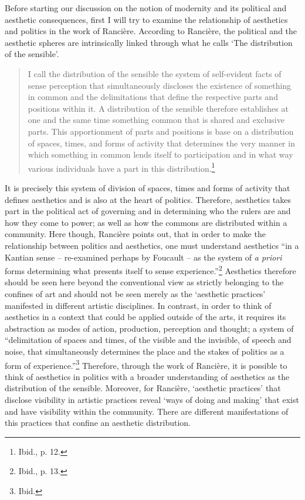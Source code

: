 Before starting our discussion on the notion of modernity and its political and aesthetic consequences, first I will try to examine the relationship of aesthetics and politics in the work of Ranci\`{e}re. According to Ranci\`{e}re, the political and the aesthetic spheres are intrinsically linked through what he calls `The distribution of the sensible'. 
\begin{quote}
I call the distribution of the sensible the system of self-evident facts of sense perception that simultaneously discloses the existence of something in common and the delimitations that define the respective parts and positions within it. A distribution of the sensible therefore establishes at one and the same time something common that is shared and exclusive parts. This apportionment of parts and positions is base on a distribution of spaces, times, and forms of activity that determines the very manner in which something in common lends itself to participation and in what way various individuals have a part in this distribution.\footnote{Ibid., p. 12.}
\end{quote}
It is precisely this system of division of spaces, times and forms of activity that defines aesthetics and is also at the heart of politics. Therefore, aesthetics takes part in the political act of governing and in determining who the rulers are and how they come to power; as well as how the commons are distributed within a community. Here though, Ranci\`{e}re points out, that in order to make the relationship between politics and aesthetics, one must understand aesthetics ``in a Kantian sense -- re-examined perhaps by Foucault -- as the system of \emph{a priori} forms determining what presents itself to sense experience.''\footnote{Ibid., p. 13.} Aesthetics therefore should be seen here beyond the conventional view as strictly belonging to the confines of art and should not be seen merely as the `aesthetic practices' manifested in different artistic disciplines.  In contrast, in order to think of aesthetics in a context that could be applied outside of the arts, it requires its abstraction as modes of action, production, perception and thought; a system of ``delimitation of spaces and times, of the visible and the invisible, of speech and noise, that simultaneously determines the place and the stakes of politics as a form of experience.''\footnote{Ibid.}
Therefore, through the work of Ranci\`{e}re, it is possible to think of aesthetics in politics with a broader understanding of aesthetics as the distribution of the sensible. Moreover, for Ranci\`{e}re, `aesthetic practices' that disclose visibility in artistic practices reveal `ways of doing and making' that exist and have visibility within the community. There are different manifestations of this practices that confine an aesthetic distribution.

